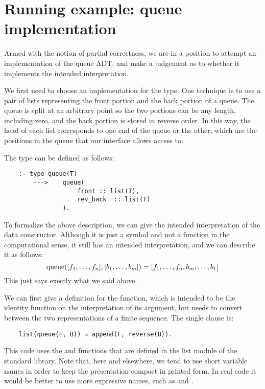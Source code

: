 \section{Running example: queue implementation}
\label{sec:queue-impl}

Armed with the notion of partial correctness,
we are in a position to attempt
an implementation of the queue ADT,
and make a judgement as to
whether it implements the intended interpretation.

We first need to choose an implementation for the  type.
One technique is to use a pair of lists
representing the front portion and the back portion of a queue.
The queue is split at an arbitrary point
so the two portions can be any length, including zero,
and the back portion is stored in reverse order.
In this way,
the head of each list corresponds to
one end of the queue or the other,
which are the positions in the queue
that our interface allows access to.

The type can be defined as follows:
\begin{verbatim}
    :- type queue(T)
        --->    queue(
                    front :: list(T),
                    rev_back  :: list(T)
                ).
\end{verbatim}
To formalize the above description,
we can give the intended interpretation of the 
data constructor.
Although it is just a symbol
and not a function in the computational sense,
it still has an intended interpretation,
and we can describe it as follows:
\[
    \operatorname{queue}([f_1, \ldots, f_n], [b_1, \ldots, b_m]) =
        [f_1, \ldots, f_n, b_m, \ldots, b_1]
\]
This just says exectly what we said above.

We can first give a definition for the  function,
which is intended to be the identity function
on the interpretation of its argument,
but needs to convert between the two representations
of a finite sequence.
The single clause is:
\begin{verbatim}
    list(queue(F, B)) = append(F, reverse(B)).
\end{verbatim}
This code uses
the  and  functions
that are defined in the list module of the standard library.
Note that, here and elsewhere,
we tend to use short variable names
in order to keep the presentation compact in printed form.
In real code it would be better to use more expressive names,
such as  and .

